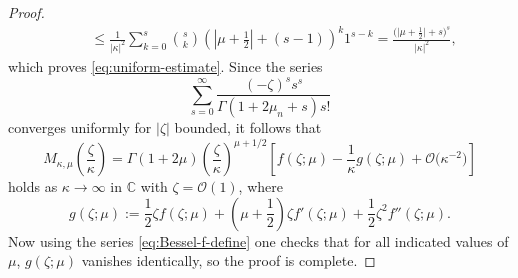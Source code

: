 \documentclass[pdftex]{sigma}
\numberwithin{equation}{section}
\begin{document}
\begin{proof}
\begin{gather*}
 \qquad\le \frac{1}{|\kappa|^2}\sum_{k=0}^s\binom{s}{k}\left(\left|\mu+\frac{1}{2}\right|+(s-1)\right)^k1^{s-k}=\frac{\big(\big|\mu+\frac{1}{2}\big|+s\big)^s}{|\kappa|^2},
\end{gather*}
which proves \eqref{eq:uniform-estimate}.
Since the series
\begin{equation*}%
 \sum_{s=0}^\infty \frac{(-\zeta)^ss^s}{\Gamma(1+2\mu_n+s)s!}
\end{equation*}
converges uniformly for $|\zeta|$ bounded, it follows that
\begin{equation*}%
 M_{\kappa,\mu}\left(\frac{\zeta}{\kappa}\right) = \Gamma(1+2\mu)\left(\frac{\zeta}{\kappa}\right)^{\mu+1/2}\left[f(\zeta;\mu) -\frac{1}{\kappa}g(\zeta;\mu) + \mathcal{O}\big(\kappa^{-2}\big)\right]
\end{equation*}
holds as $\kappa\to\infty$ in $\mathbb{C}$ with $\zeta=\mathcal{O}(1)$, where
\begin{equation*}%
 g(\zeta;\mu):=\frac{1}{2}\zeta f(\zeta;\mu)+\left(\mu+\frac{1}{2}\right)\zeta f'(\zeta;\mu) +\frac{1}{2}\zeta^2f''(\zeta;\mu).
\end{equation*}
Now using the series \eqref{eq:Bessel-f-define} one checks that for all indicated values of $\mu$, $g(\zeta;\mu)$ vanishes identically, so the proof is complete.
\end{proof}
\end{document}
